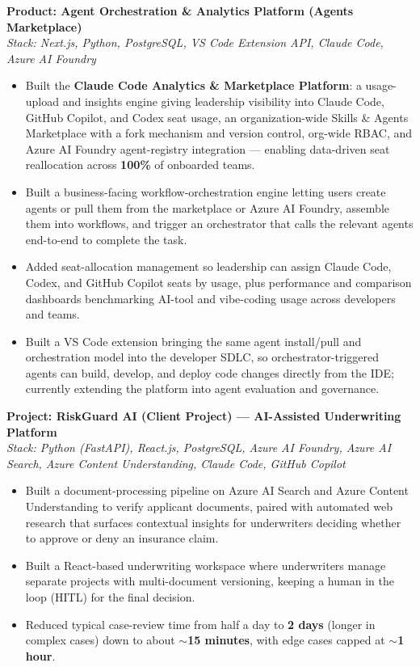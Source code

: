 \documentclass[a4paper,10.5pt]{article}
\begin{document}
\vspace{6pt}
\noindent\textbf{Product: Agent Orchestration \& Analytics Platform (Agents Marketplace)}\\
\textit{Stack: Next.js, Python, PostgreSQL, VS Code Extension API, Claude Code, Azure AI Foundry}
\begin{itemize}
\item Built the \textbf{Claude Code Analytics \& Marketplace Platform}: a usage-upload and insights engine giving leadership visibility into Claude Code, GitHub Copilot, and Codex seat usage, an organization-wide Skills \& Agents Marketplace with a fork mechanism and version control, org-wide RBAC, and Azure AI Foundry agent-registry integration --- enabling data-driven seat reallocation across \textbf{100\%} of onboarded teams.
\item Built a business-facing workflow-orchestration engine letting users create agents or pull them from the marketplace or Azure AI Foundry, assemble them into workflows, and trigger an orchestrator that calls the relevant agents end-to-end to complete the task.
\item Added seat-allocation management so leadership can assign Claude Code, Codex, and GitHub Copilot seats by usage, plus performance and comparison dashboards benchmarking AI-tool and vibe-coding usage across developers and teams.
\item Built a VS Code extension bringing the same agent install/pull and orchestration model into the developer SDLC, so orchestrator-triggered agents can build, develop, and deploy code changes directly from the IDE; currently extending the platform into agent evaluation and governance.
\end{itemize}

\vspace{6pt}
\noindent\textbf{Project: RiskGuard AI (Client Project) --- AI-Assisted Underwriting Platform}\\
\textit{Stack: Python (FastAPI), React.js, PostgreSQL, Azure AI Foundry, Azure AI Search, Azure Content Understanding, Claude Code, GitHub Copilot}
\begin{itemize}
\item Built a document-processing pipeline on Azure AI Search and Azure Content Understanding to verify applicant documents, paired with automated web research that surfaces contextual insights for underwriters deciding whether to approve or deny an insurance claim.
\item Built a React-based underwriting workspace where underwriters manage separate projects with multi-document versioning, keeping a human in the loop (HITL) for the final decision.
\item Reduced typical case-review time from half a day to \textbf{2 days} (longer in complex cases) down to about \textbf{$\sim$15 minutes}, with edge cases capped at \textbf{$\sim$1 hour}.
\end{itemize}
\end{document}
